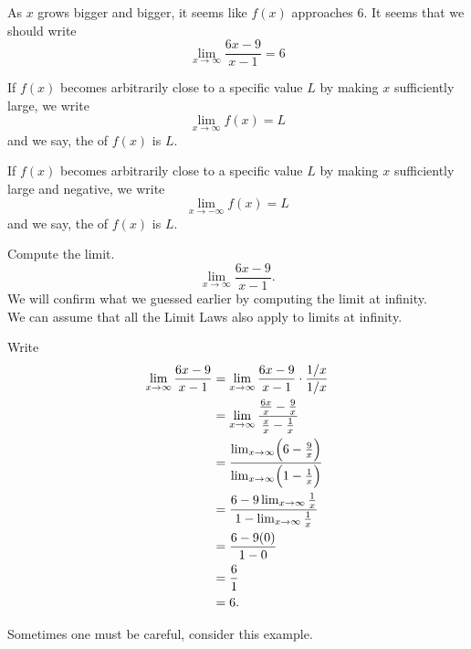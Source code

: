 \documentclass{ximera}
\begin{document}
As $x$ grows bigger and bigger, it seems like $f(x)$ approaches $6$.
It seems that we should write
\[
 \lim_{x\to \infty}\frac{6x-9}{x-1}=6 
\]

\begin{definition}\label{def:limitAtInfty}
If $f(x)$ becomes arbitrarily close to a specific value $L$ by making
$x$ sufficiently large, we write
\[
\lim_{x\to \infty} f(x) = L
\]
and we say, the  of $f(x)$ is $L$.  

If $f(x)$ becomes arbitrarily close to a specific value $L$ by making
$x$ sufficiently large and negative, we write
\[
\lim_{x\to -\infty} f(x) = L
\]
and we say, the  of $f(x)$ is $L$.  
\end{definition}

\begin{example}  Compute the limit.
\[
\lim_{x\to\infty} \frac{6x-9}{x-1}.
\]
We will confirm what we guessed earlier by computing the limit at infinity.\\
 We can assume that all the Limit Laws also apply to limits at infinity.
\begin{explanation}
Write
\begin{align*}
\lim_{x\to\infty}\frac{6x-9}{x-1} &= \lim_{x\to\infty}\frac{6x-9}{x-1}\cdot \frac{1/x}{1/x}\\
&=\lim_{x\to\infty}\frac{\frac{6x}{x} - \frac{9}{x}}{\frac{x}{x} - \frac{1}{x}}\\
&=\frac{\lim_{x\to\infty}\Bigl(6- \frac{9}{x}\Bigr)}{\lim_{x\to\infty}\Bigl(1- \frac{1}{x}\Bigr)}\\
&=\frac{6-9\lim_{x\to\infty}  \frac{1}{x}}{1-\lim_{x\to\infty} \frac{1}{x}}\\
&=\frac{6-9(0)}{1-0}\\
&=  \frac{6}{1}\\
&= 6.
\end{align*}
\end{explanation}
\end{example}

Sometimes one must be careful, consider this example.
\end{document}
